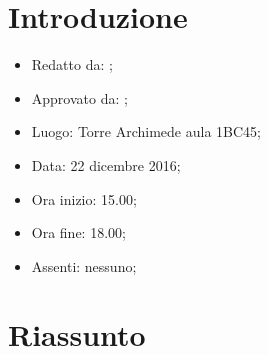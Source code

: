 \section{Introduzione}

	\begin{itemize}
		\item Redatto da: ;
		\item Approvato da: \NS;
		\item Luogo: Torre Archimede aula 1BC45;
		\item Data: 22 dicembre 2016;
		\item Ora inizio: 15.00;
		\item Ora fine: 18.00;
		\item Assenti: nessuno;		
	\end{itemize}

\section{Riassunto}
